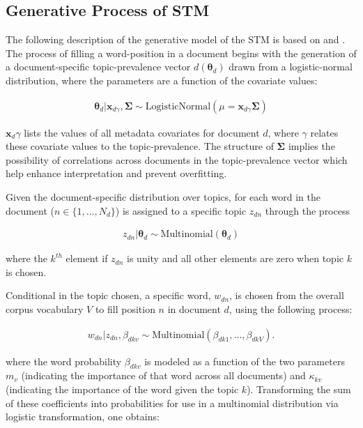 \documentclass[12pt,a4paper,notitlepage]{article}
\begin{document}
\subsection{Generative Process of STM}

The following description of the generative model of the STM is based on \citet{roberts_structural_2013} and \citet{roberts_stm:_2016}. The process of filling a word-position in a document begins with the generation of a document-specific topic-prevalence vector $d(\boldsymbol{\theta}_d)$ drawn from a logistic-normal distribution, where the parameters are a function of the covariate values:

\begin{align*}
	\boldsymbol{\theta}_d|\boldsymbol{x}_{d\gamma},\boldsymbol{\Sigma} \sim \textrm{LogisticNormal}(\mu = \boldsymbol{x}_{d\gamma}\boldsymbol{\Sigma})
\end{align*}

$\boldsymbol{x}_d\gamma$ lists the values of all metadata covariates for document $d$, where $\gamma$ relates these covariate values to the topic-prevalence. The structure of $\boldsymbol{\Sigma}$ implies the possibility of correlations across documents in the topic-prevalence vector which help enhance interpretation and prevent overfitting. 

Given the document-specific distribution over topics, for each word in the document ($n \in \lbrace 1,...,N_d\rbrace$) is assigned to a specific topic $z_{dn}$ through the process

\begin{align*}
	z_{dn}|\boldsymbol{\theta}_d \sim \textrm{Multinomial}(\boldsymbol{\theta}_d)
\end{align*}

where the $k^{th}$ element if $z_{dn}$ is unity and all other elements are zero when topic $k$ is chosen. 

Conditional in the topic chosen, a specific word, $w_{dn}$, is chosen from the overall corpus vocabulary $V$ to fill position $n$ in document $d$, using the following process:

\begin{align*}
	w_{dn}|z_{dn},\beta_{dkv} \sim \textrm{Multinomial}(\beta_{dk1},...,\beta_{dkV}).
\end{align*}

where the word probability $\beta_{dkv}$ is modeled as a function of the two parameters $m_v$ (indicating the importance of that word across all documents) and $\kappa_{kv}$ (indicating the importance of the word given the topic $k$). Transforming the sum of these coefficients into probabilities for use in a multinomial distribution via logistic transformation, one obtains:
\end{document}
